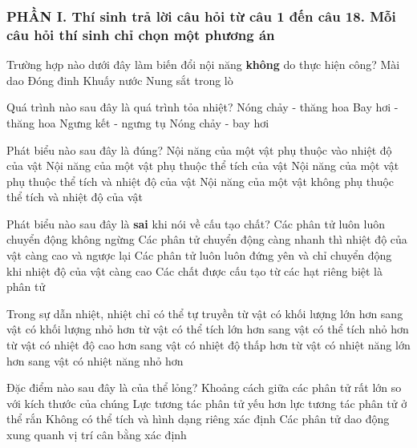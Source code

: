\subsubsection*{PHẦN I. Thí sinh trả lời câu hỏi từ câu 1 đến câu 18. Mỗi câu hỏi thí sinh chỉ chọn một phương án}
\setcounter{ex}{0}
\begin{ex}%
	Trường hợp nào dưới đây làm biến đổi nội năng \textbf{không} do thực hiện công?
	\choice
	{Mài dao}
	{Đóng đinh}
	{Khuấy nước}
	{\True Nung sắt trong lò}
	\loigiai{}
\end{ex}


\begin{ex}%
	Quá trình nào sau đây là quá trình tỏa nhiệt?
	\choice
	{Nóng chảy - thăng hoa}
	{Bay hơi - thăng hoa}
	{\True Ngưng kết - ngưng tụ}
	{Nóng chảy - bay hơi}
	\loigiai{}
\end{ex}

\begin{ex}%
	Phát biểu nào sau đây là đúng?
	\choice
	{Nội năng của một vật phụ thuộc vào nhiệt độ của vật}
	{Nội năng của một vật phụ thuộc thể tích của vật}
	{\True Nội năng của một vật phụ thuộc thể tích và nhiệt độ của vật}
	{Nội năng của một vật không phụ thuộc thể tích và nhiệt độ của vật}
	\loigiai{}
\end{ex}

\begin{ex}%
	Phát biểu nào sau đây là \textbf{sai} khi nói về cấu tạo chất?
	\choice
	{Các phân tử luôn luôn chuyển động không ngừng}
	{Các phân tử chuyển động càng nhanh thì nhiệt độ của vật càng cao và ngược lại}
	{\True Các phân tử luôn luôn đứng yên và chỉ chuyển động khi nhiệt độ của vật càng cao}
	{Các chất được cấu tạo từ các hạt riêng biệt là phân tử}
	\loigiai{}
\end{ex}

\begin{ex}%
	Trong sự dẫn nhiệt, nhiệt chỉ có thể tự truyền
	\choice
	{từ vật có khối lượng lớn hơn sang vật có khối lượng nhỏ hơn}
	{từ vật có thể tích lớn hơn sang vật có thể tích nhỏ hơn}
	{\True từ vật có nhiệt độ cao hơn sang vật có nhiệt độ thấp hơn}
	{từ vật có nhiệt năng lớn hơn sang vật có nhiệt năng nhỏ hơn}
	\loigiai{}
\end{ex}
\begin{ex}%
	Đặc điểm nào sau đây là của thể lỏng?
	\choice
	{Khoảng cách giữa các phân tử rất lớn so với kích thước của chúng}
	{\True Lực tương tác phân tử yếu hơn lực tương tác phân tử ở thể rắn}
	{Không có thể tích và hình dạng riêng xác định}
	{Các phân tử dao động xung quanh vị trí cân bằng xác định}
	\loigiai{}	
\end{ex}

